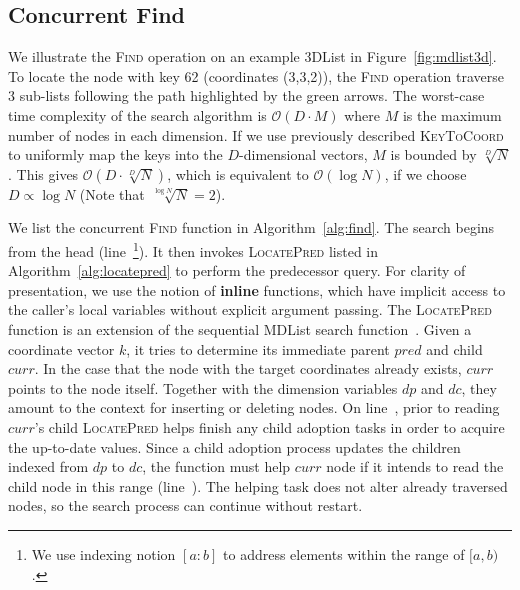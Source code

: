 \documentclass[10pt,conference,compsocconf]{IEEEtran}
\begin{document}
\subsection{Concurrent Find}
\label{sec:cdictfind}
We illustrate the \textsc{Find} operation on an example 3DList in Figure~\ref{fig:mdlist3d}.
To locate the node with key 62 (coordinates (3,3,2)), the \textsc{Find} operation traverse 3 sub-lists following the path highlighted by the green arrows. 
The worst-case time complexity of the search algorithm is $\mathcal{O}(D \cdot M)$ where $M$ is the maximum number of nodes in each dimension.
If we use previously described \textsc{KeyToCoord} to uniformly map the keys into the $D$-dimensional vectors, $M$ is bounded by $\sqrt[D]{N}$.
This gives $\mathcal{O}(D \cdot \sqrt[D]{N})$, which is equivalent to $\mathcal{O}(\log{N})$, if we choose $D \propto \log{N}$ (Note that $\sqrt[\log{N}]{N}=2$).

We list the concurrent \textsc{Find} function in Algorithm~\ref{alg:find}.
The search begins from the head (line~\footnote{We use indexing notion $[a:b]$ to address elements within the range of $[a, b)$.}).
It then invokes \textsc{LocatePred} listed in Algorithm~\ref{alg:locatepred} to perform the predecessor query.
For clarity of presentation, we use the notion of \textbf{inline} functions, which have implicit access to the caller's local variables without explicit argument passing.
The \textsc{LocatePred} function is an extension of the sequential MDList search function~\cite{zhang2015lockfree}.
Given a coordinate vector $k$, it tries to determine its immediate parent $pred$ and child $curr$.
In the case that the node with the target coordinates already exists, $curr$ points to the node itself.
Together with the dimension variables $dp$ and $dc$, they amount to the context for inserting or deleting nodes.
On line~, prior to reading $curr$'s child \textsc{LocatePred} helps finish any child adoption tasks in order to acquire the up-to-date values.
Since a child adoption process updates the children indexed from $dp$ to $dc$, the function must help $curr$ node if it intends to read the child node in this range (line~).
The helping task does not alter already traversed nodes, so the search process can continue without restart.
\end{document}
